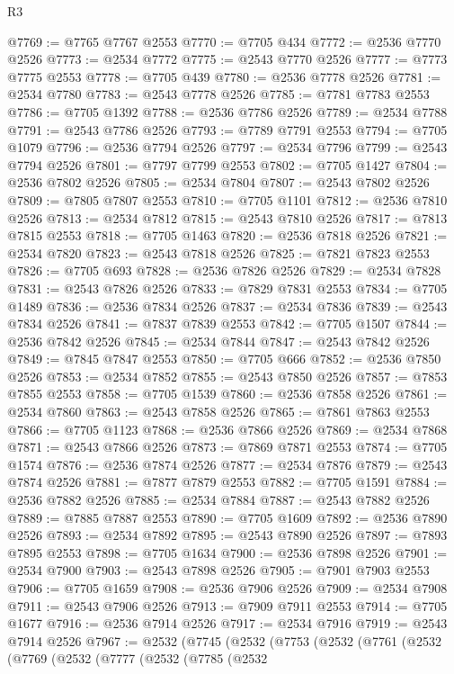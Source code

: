 \begin{lexlean}{R3}
\begin{coremodule}
@7769 := @7765 @7767 @2553
@7770 := @7705 @434
@7772 := @2536 @7770 @2526
@7773 := @2534 @7772
@7775 := @2543 @7770 @2526
@7777 := @7773 @7775 @2553
@7778 := @7705 @439
@7780 := @2536 @7778 @2526
@7781 := @2534 @7780
@7783 := @2543 @7778 @2526
@7785 := @7781 @7783 @2553
@7786 := @7705 @1392
@7788 := @2536 @7786 @2526
@7789 := @2534 @7788
@7791 := @2543 @7786 @2526
@7793 := @7789 @7791 @2553
@7794 := @7705 @1079
@7796 := @2536 @7794 @2526
@7797 := @2534 @7796
@7799 := @2543 @7794 @2526
@7801 := @7797 @7799 @2553
@7802 := @7705 @1427
@7804 := @2536 @7802 @2526
@7805 := @2534 @7804
@7807 := @2543 @7802 @2526
@7809 := @7805 @7807 @2553
@7810 := @7705 @1101
@7812 := @2536 @7810 @2526
@7813 := @2534 @7812
@7815 := @2543 @7810 @2526
@7817 := @7813 @7815 @2553
@7818 := @7705 @1463
@7820 := @2536 @7818 @2526
@7821 := @2534 @7820
@7823 := @2543 @7818 @2526
@7825 := @7821 @7823 @2553
@7826 := @7705 @693
@7828 := @2536 @7826 @2526
@7829 := @2534 @7828
@7831 := @2543 @7826 @2526
@7833 := @7829 @7831 @2553
@7834 := @7705 @1489
@7836 := @2536 @7834 @2526
@7837 := @2534 @7836
@7839 := @2543 @7834 @2526
@7841 := @7837 @7839 @2553
@7842 := @7705 @1507
@7844 := @2536 @7842 @2526
@7845 := @2534 @7844
@7847 := @2543 @7842 @2526
@7849 := @7845 @7847 @2553
@7850 := @7705 @666
@7852 := @2536 @7850 @2526
@7853 := @2534 @7852
@7855 := @2543 @7850 @2526
@7857 := @7853 @7855 @2553
@7858 := @7705 @1539
@7860 := @2536 @7858 @2526
@7861 := @2534 @7860
@7863 := @2543 @7858 @2526
@7865 := @7861 @7863 @2553
@7866 := @7705 @1123
@7868 := @2536 @7866 @2526
@7869 := @2534 @7868
@7871 := @2543 @7866 @2526
@7873 := @7869 @7871 @2553
@7874 := @7705 @1574
@7876 := @2536 @7874 @2526
@7877 := @2534 @7876
@7879 := @2543 @7874 @2526
@7881 := @7877 @7879 @2553
@7882 := @7705 @1591
@7884 := @2536 @7882 @2526
@7885 := @2534 @7884
@7887 := @2543 @7882 @2526
@7889 := @7885 @7887 @2553
@7890 := @7705 @1609
@7892 := @2536 @7890 @2526
@7893 := @2534 @7892
@7895 := @2543 @7890 @2526
@7897 := @7893 @7895 @2553
@7898 := @7705 @1634
@7900 := @2536 @7898 @2526
@7901 := @2534 @7900
@7903 := @2543 @7898 @2526
@7905 := @7901 @7903 @2553
@7906 := @7705 @1659
@7908 := @2536 @7906 @2526
@7909 := @2534 @7908
@7911 := @2543 @7906 @2526
@7913 := @7909 @7911 @2553
@7914 := @7705 @1677
@7916 := @2536 @7914 @2526
@7917 := @2534 @7916
@7919 := @2543 @7914 @2526
@7967 := @2532
    (@7745
      (@2532
        (@7753
          (@2532
            (@7761
              (@2532
                (@7769
                  (@2532
                    (@7777
                      (@2532
                        (@7785
                          (@2532

\end{coremodule}
\end{lexlean}
